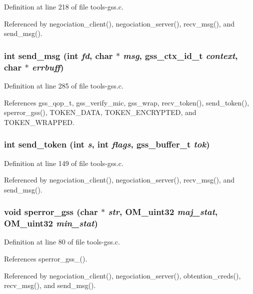 Definition at line 218 of file tools-gss.c.

Referenced by negociation\_\-client(), negociation\_\-server(), recv\_\-msg(), and send\_\-msg().
\subsubsection{\setlength{\rightskip}{0pt plus 5cm}int send\_\-msg (int {\em fd}, char $\ast$ {\em msg}, gss\_\-ctx\_\-id\_\-t {\em context}, char $\ast$ {\em errbuff})}\label{tools-gss_8c_a28}




Definition at line 285 of file tools-gss.c.

References gss\_\-qop\_\-t, gss\_\-verify\_\-mic, gss\_\-wrap, recv\_\-token(), send\_\-token(), sperror\_\-gss(), TOKEN\_\-DATA, TOKEN\_\-ENCRYPTED, and TOKEN\_\-WRAPPED.
\subsubsection{\setlength{\rightskip}{0pt plus 5cm}int send\_\-token (int {\em s}, int {\em flags}, gss\_\-buffer\_\-t {\em tok})}\label{tools-gss_8c_a26}




Definition at line 149 of file tools-gss.c.

Referenced by negociation\_\-client(), negociation\_\-server(), recv\_\-msg(), and send\_\-msg().
\subsubsection{\setlength{\rightskip}{0pt plus 5cm}void sperror\_\-gss (char $\ast$ {\em str}, OM\_\-uint32 {\em maj\_\-stat}, OM\_\-uint32 {\em min\_\-stat})}\label{tools-gss_8c_a23}




Definition at line 80 of file tools-gss.c.

References sperror\_\-gss\_().

Referenced by negociation\_\-client(), negociation\_\-server(), obtention\_\-creds(), recv\_\-msg(), and send\_\-msg().
